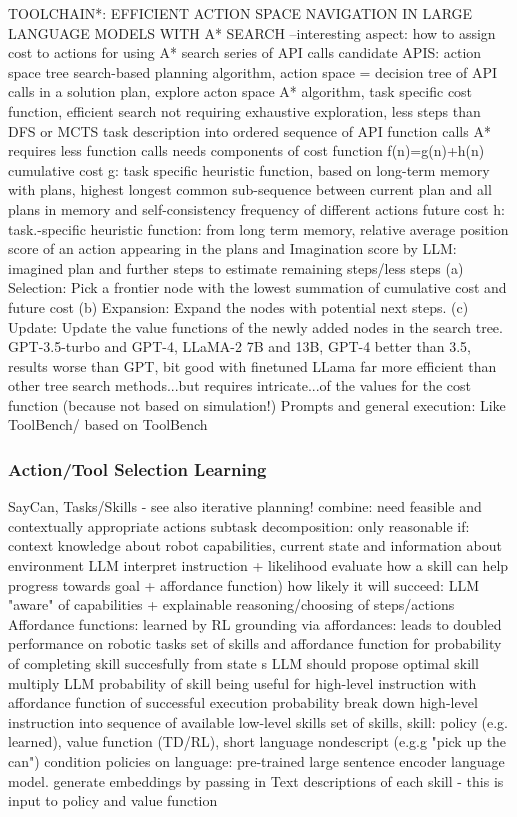 \documentclass{article}
\begin{document}
\cite{zhuang_toolchain_2023} TOOLCHAIN*: EFFICIENT ACTION SPACE NAVIGATION IN LARGE LANGUAGE MODELS WITH A* SEARCH
--interesting aspect: how to assign cost to actions for using A* search
series of API calls
candidate APIS: action space
tree search-based planning algorithm, action space = decision tree of API calls in a solution plan, explore acton space
A* algorithm, task specific cost function, efficient search not requiring exhaustive exploration, less steps than DFS or MCTS
task description into ordered sequence of API function calls
A* requires less function calls
needs components of cost function f(n)=g(n)+h(n)
cumulative cost g: task specific heuristic function, based on long-term memory with plans, highest longest common sub-sequence between current plan and all plans in memory and self-consistency frequency of different actions
future cost h: task.-specific heuristic function: from long term memory, relative average position score of an action appearing in the plans and Imagination score by LLM: imagined plan and further steps to estimate remaining steps/less steps
(a) Selection: Pick a frontier node with the lowest summation of cumulative cost and future cost
(b) Expansion: Expand the nodes with potential next steps.
(c) Update: Update the value functions of the newly added nodes in the search tree.
GPT-3.5-turbo and GPT-4, LLaMA-2 7B and 13B, GPT-4 better than 3.5, results worse than GPT, bit good with finetuned LLama
far more efficient than other tree search methods...but requires intricate...of the values for the cost function (because not based on simulation!)
Prompts and general execution: Like ToolBench/ based on ToolBench


\subsubsection{Action/Tool Selection Learning}

\cite{ahn_as_2022} SayCan, Tasks/Skills - see also iterative planning!
combine: need feasible and contextually appropriate actions
subtask decomposition: only reasonable if: context knowledge about robot capabilities, current state and information about environment
LLM interpret instruction + likelihood evaluate how a skill can help progress towards goal + affordance function) how likely it will succeed: LLM "aware" of capabilities + explainable reasoning/choosing of steps/actions
Affordance functions: learned by RL
grounding via affordances: leads to doubled performance on robotic tasks
set of skills and affordance function for probability of completing skill succesfully from state s
LLM should propose optimal skill
multiply LLM probability of skill being useful for high-level instruction with affordance function of successful execution probability
break down high-level instruction into sequence of available low-level skills
set of skills, skill: policy (e.g. learned), value function (TD/RL), short language nondescript (e.g.g "pick up the can")
condition policies on language: pre-trained large sentence encoder language model. generate embeddings by passing in Text descriptions of each skill -  this is input to policy and value function
\end{document}
